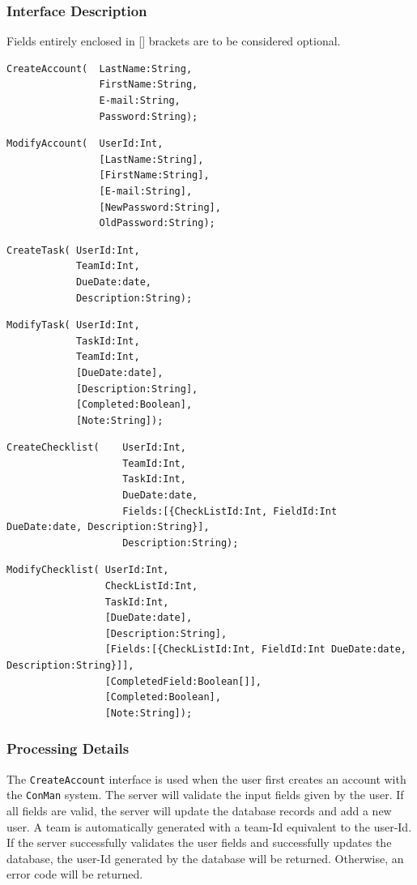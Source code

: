 \documentclass{article}
\begin{document}
\subsubsection{Interface Description}
Fields entirely enclosed in [] brackets are to be considered optional.
\begin{lstlisting}
CreateAccount(  LastName:String,
                FirstName:String,
                E-mail:String,
                Password:String);
\end{lstlisting}

\begin{lstlisting}
ModifyAccount(  UserId:Int,
                [LastName:String],
                [FirstName:String],
                [E-mail:String],
                [NewPassword:String],
                OldPassword:String);
\end{lstlisting}

\begin{lstlisting}
CreateTask( UserId:Int,
            TeamId:Int,
            DueDate:date,
            Description:String);
\end{lstlisting}

\begin{lstlisting}
ModifyTask( UserId:Int,
            TaskId:Int,
            TeamId:Int,
            [DueDate:date],
            [Description:String],
            [Completed:Boolean],
            [Note:String]);
\end{lstlisting}

\begin{lstlisting}
CreateChecklist(    UserId:Int,
                    TeamId:Int,
                    TaskId:Int,
                    DueDate:date,
                    Fields:[{CheckListId:Int, FieldId:Int DueDate:date, Description:String}],
                    Description:String);
\end{lstlisting}

\begin{lstlisting}
ModifyChecklist( UserId:Int,
                 CheckListId:Int,
                 TaskId:Int,
                 [DueDate:date],
                 [Description:String],
                 [Fields:[{CheckListId:Int, FieldId:Int DueDate:date, Description:String}]],
                 [CompletedField:Boolean[]],
                 [Completed:Boolean],
                 [Note:String]);
\end{lstlisting}

\subsubsection{Processing Details}
The \texttt{CreateAccount} interface is used when the user first creates an account with the \texttt{ConMan} system.
The server will validate the input fields given by the user.
If all fields are valid, the server will update the database records and add a new user.
A team is automatically generated with a team-Id equivalent to the user-Id.
If the server successfully validates the user fields and successfully updates the database, the user-Id generated by the database will be returned.
Otherwise, an error code will be returned.
\end{document}
